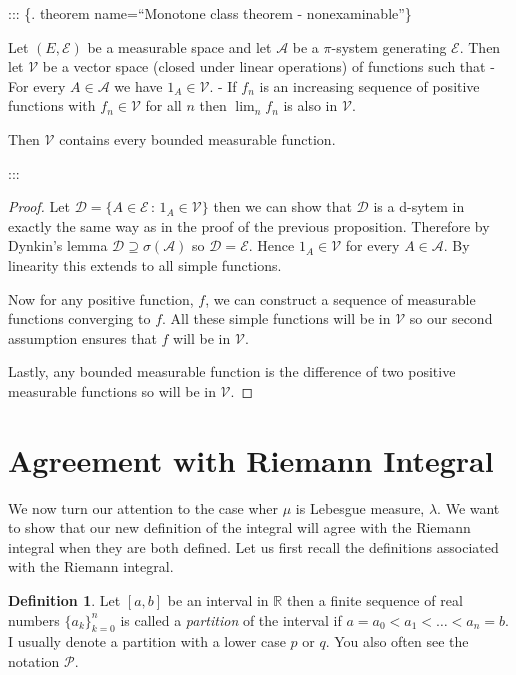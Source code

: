 \documentclass[
]{book}
\theoremstyle{definition}
\newtheorem{definition}{Definition}[chapter]
\theoremstyle{definition}
\theoremstyle{definition}
\theoremstyle{definition}
\theoremstyle{remark}
\begin{document}
::: \{. theorem name=``Monotone class theorem - nonexaminable''\}

Let \((E, \mathcal{E})\) be a measurable space and let \(\mathcal{A}\) be a \(\pi\)-system generating \(\mathcal{E}\). Then let \(\mathcal{V}\) be a vector space (closed under linear operations) of functions such that
- For every \(A \in \mathcal{A}\) we have \(1_A \in \mathcal{V}\).
- If \(f_n\) is an increasing sequence of positive functions with \(f_n \in \mathcal{V}\) for all \(n\) then \(\lim_n f_n\) is also in \(\mathcal{V}\).

Then \(\mathcal{V}\) contains every bounded measurable function.

:::

\begin{proof}
Let \(\mathcal{D} = \{ A \in \mathcal{E} \,:\, 1_A \in \mathcal{V}\}\) then we can show that \(\mathcal{D}\) is a d-sytem in exactly the same way as in the proof of the previous proposition. Therefore by Dynkin's lemma \(\mathcal{D} \supseteq \sigma(\mathcal{A})\) so \(\mathcal{D} = \mathcal{E}\). Hence \(1_A \in \mathcal{V}\) for every \(A \in \mathcal{A}\). By linearity this extends to all simple functions.

Now for any positive function, \(f\), we can construct a sequence of measurable functions converging to \(f\). All these simple functions will be in \(\mathcal{V}\) so our second assumption ensures that \(f\) will be in \(\mathcal{V}\).

Lastly, any bounded measurable function is the difference of two positive measurable functions so will be in \(\mathcal{V}\).
\end{proof}

\hypertarget{agreement-with-riemann-integral}{%
\section{Agreement with Riemann Integral}\label{agreement-with-riemann-integral}}

We now turn our attention to the case wher \(\mu\) is Lebesgue measure, \(\lambda\). We want to show that our new definition of the integral will agree with the Riemann integral when they are both defined. Let us first recall the definitions associated with the Riemann integral.

\begin{definition}
Let \([a,b]\) be an interval in \(\mathbb{R}\) then a finite sequence of real numbers \(\{a_k\}_{k=0}^n\) is called a \emph{partition} of the interval if \(a=a_0 < a_1 < \dots<a_n=b\). I usually denote a partition with a lower case \(p\) or \(q\). You also often see the notation \(\mathscr{P}\).
\end{definition}
\end{document}
